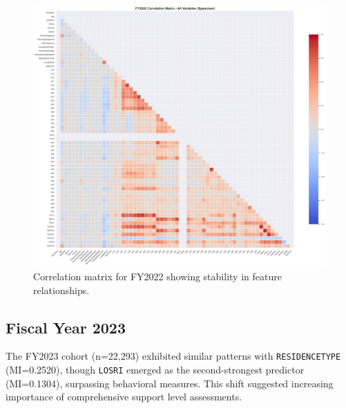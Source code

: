 \begin{figure}[htbp]
    \centering
    \includegraphics[width=\textwidth]{figures/fy2022_correlation_matrix_-_all_variables_(spearman).png}
    \caption{Correlation matrix for FY2022 showing stability in feature relationships.}
    \label{fig:fy2022-corr-all}
\end{figure}

\newpage

\subsection{Fiscal Year 2023}
\label{subsec:fy2023}

The FY2023 cohort (n=22,293) exhibited similar patterns with \texttt{RESIDENCETYPE} (MI=0.2520), though \texttt{LOSRI} emerged as the second-strongest predictor (MI=0.1304), surpassing behavioral measures. This shift suggested increasing importance of comprehensive support level assessments.


